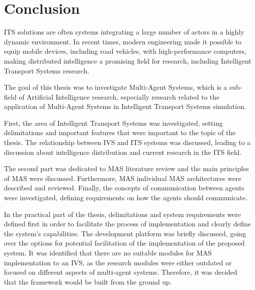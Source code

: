 \documentclass[titlepage, 12pt]{article}
\begin{document}










\clearpage

\section{Conclusion}

ITS solutions are often systems integrating a large number of 
actors in a highly dynamic environment. In recent times, modern engineering made it possible 
to equip mobile devices, including road vehicles, with high-performance computers, making 
distributed intelligence a promising field for research, including Intelligent Transport Systems 
research.

The goal of this thesis was to investigate Multi-Agent Systems, which is a sub-field of Artificial Intelligence 
research, especially research related to the application of Multi-Agent Systems in Intelligent Transport Systems 
simulation. 

First, the area of Intelligent Transport Systems was investigated, setting delimitations and important features 
that were important to the topic of the thesis. The relationship between IVS and ITS systems was discussed, leading 
to a discussion about intelligence distribution and current research in the ITS field. 

The second part was dedicated to MAS literature review and the main principles of MAS were discussed. Furthermore, MAS 
individual MAS architectures were described and reviewed. Finally, the concepts of communication between agents were investigated,
defining requirements on how the agents should communicate. 

In the practical part of the thesis, delimitations and system requirements were defined first in order to facilitate the 
process of implementation and clearly define the system's capabilities. The development platform was briefly discussed, 
going over the options for potential facilitation of the implementation of the proposed system. It was identified that 
there are no suitable modules for MAS implementation to an IVS, as the research modules were either outdated or focused on 
different aspects of multi-agent systems. Therefore, it was decided that the framework would be built from the ground up.
\end{document}
